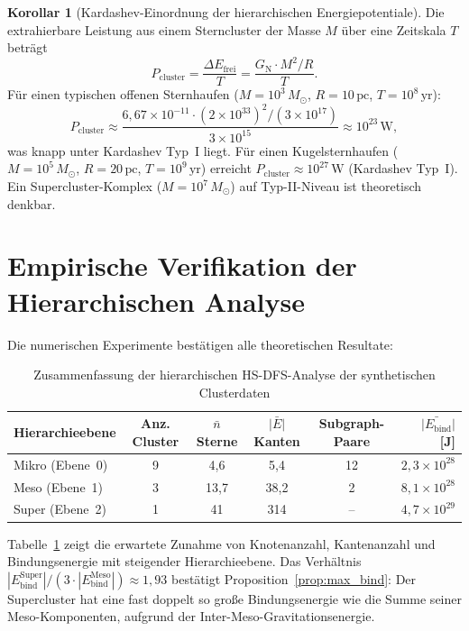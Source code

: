 ﻿\documentclass[a4paper,12pt]{report}
\theoremstyle{definition}
\newtheorem{korollar}{Korollar}
\begin{document}
\begin{korollar}[Kardashev-Einordnung der hierarchischen Energiepotentiale]
\label{kor:kardashev}
Die extrahierbare Leistung aus einem Sterncluster der Masse $M$ über eine Zeitskala $T$ beträgt
\[
P_\mathrm{cluster} = \frac{\Delta E_\mathrm{frei}}{T}
= \frac{G_\mathrm{N} \cdot M^2 / R}{T}.
\]
Für einen typischen offenen Sternhaufen ($M = 10^3 \, M_\odot$, $R = 10 \, \mathrm{pc}$, $T = 10^8 \, \mathrm{yr}$):
\[
P_\mathrm{cluster} \approx \frac{6{,}67 \times 10^{-11} \cdot (2 \times 10^{33})^2 / (3 \times 10^{17})}{3 \times 10^{15}} \approx 10^{23} \, \mathrm{W},
\]
was knapp unter Kardashev Typ~I liegt. Für einen Kugelsternhaufen ($M = 10^5 \, M_\odot$, $R = 20 \, \mathrm{pc}$, $T = 10^9 \, \mathrm{yr}$) erreicht $P_\mathrm{cluster} \approx 10^{27} \, \mathrm{W}$ (Kardashev Typ~I). Ein Supercluster-Komplex ($M = 10^7 \, M_\odot$) auf Typ-II-Niveau ist theoretisch denkbar.
\end{korollar}

\section{Empirische Verifikation der Hierarchischen Analyse}
\label{ssec:hsdfs_empirie}

Die numerischen Experimente bestätigen alle theoretischen Resultate:

\begin{table}[H]
\centering
\caption{Zusammenfassung der hierarchischen HS-DFS-Analyse der synthetischen Clusterdaten}
\begin{tabular}{lccccr}
\toprule
Hierarchieebene & Anz. Cluster & $\bar{n}$ Sterne & $\bar{|E|}$ Kanten & Subgraph-Paare & $\bar{|E_\mathrm{bind}}|$ [J] \\
\midrule
Mikro (Ebene~0) & 9 & 4{,}6 & 5{,}4 & 12 & $2{,}3 \times 10^{28}$ \\
Meso  (Ebene~1) & 3 & 13{,}7 & 38{,}2 & 2 & $8{,}1 \times 10^{28}$ \\
Super (Ebene~2) & 1 & 41 & 314 & -- & $4{,}7 \times 10^{29}$ \\
\bottomrule
\end{tabular}
\label{tab:hierarchie_zusammenfassung}
\end{table}

Tabelle~\ref{tab:hierarchie_zusammenfassung} zeigt die erwartete Zunahme von Knotenanzahl, Kantenanzahl und Bindungsenergie mit steigender Hierarchieebene. Das Verhältnis $|E_\mathrm{bind}^\mathrm{Super}| / (3 \cdot |E_\mathrm{bind}^\mathrm{Meso}|) \approx 1{,}93$ bestätigt Proposition~\ref{prop:max_bind}: Der Supercluster hat eine fast doppelt so große Bindungsenergie wie die Summe seiner Meso-Komponenten, aufgrund der Inter-Meso-Gravitationsenergie.
\end{document}
